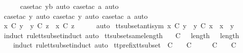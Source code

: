 \begin{isabellebody}
\ \ \ \ \isamarkupfalse%
\ {\isacharparenleft}case{\isacharunderscore}tac\ yb{\isacharcomma}\ auto{\isacharcomma}\ case{\isacharunderscore}tac\ a{\isacharcomma}\ auto{\isacharparenright}\isanewline
\ \ \ \ \isamarkupfalse%
\ {\isacharparenleft}case{\isacharunderscore}tac\ y{\isacharcomma}\ auto{\isacharcomma}\ case{\isacharunderscore}tac\ y{\isacharcomma}\ auto{\isacharcomma}\ case{\isacharunderscore}tac\ a{\isacharcomma}\ auto{\isacharparenright}{\isacharplus}\isanewline
\ \ \ \ \isamarkupfalse%
\ \ \isanewline
\ \ \isamarkupfalse%
\ \isamarkupfalse%
\ {\isachardoublequoteopen}x\ {\isasymsubseteq}\isactrlsub C\ y\ {\isasymLongrightarrow}\ y\ {\isasymsubseteq}\isactrlsub C\ z\ {\isasymLongrightarrow}\ x\ {\isasymsubseteq}\isactrlsub C\ z{\isachardoublequoteclose}\isanewline
\ \ \ \ \isamarkupfalse%
\ auto\isanewline
{}\isamarkupfalse%
%
\endisatagproof
{\isafoldproof}%
%
\isadelimproof
\isanewline
%
\endisadelimproof
\isanewline
{}\isamarkupfalse%
\ tt{\isacharunderscore}subset{\isacharunderscore}antisym{\isacharcolon}\ {\isachardoublequoteopen}x\ {\isasymsubseteq}\isactrlsub C\ y\ {\isasymLongrightarrow}\ y\ {\isasymsubseteq}\isactrlsub C\ x\ {\isasymLongrightarrow}\ x\ {\isacharequal}\ y{\isachardoublequoteclose}\isanewline
%
\isadelimproof
\ \ %
\endisadelimproof
%
\isatagproof
{}\isamarkupfalse%
\ {\isacharparenleft}induct\ rule{\isacharcolon}tt{\isacharunderscore}subset{\isachardot}induct{\isacharcomma}\ auto{\isacharparenright}%
\endisatagproof
{\isafoldproof}%
%
\isadelimproof
\isanewline
%
\endisadelimproof
\isanewline
{}\isamarkupfalse%
\ tt{\isacharunderscore}subset{\isacharunderscore}same{\isacharunderscore}length{\isacharcolon}\isanewline
\ \ {\isachardoublequoteopen}{\isasymrho}\ {\isasymsubseteq}\isactrlsub C\ {\isasymsigma}\ {\isasymLongrightarrow}\ length\ {\isasymrho}\ {\isacharequal}\ length\ {\isasymsigma}{\isachardoublequoteclose}\isanewline
%
\isadelimproof
\ \ %
\endisadelimproof
%
\isatagproof
{}\isamarkupfalse%
\ {\isacharparenleft}induct\ rule{\isacharcolon}tt{\isacharunderscore}subset{\isachardot}induct{\isacharcomma}\ auto{\isacharparenright}%
\endisatagproof
{\isafoldproof}%
%
\isadelimproof
\isanewline
%
\endisadelimproof
\isanewline
{}\isamarkupfalse%
\ tt{\isacharunderscore}prefix{\isacharunderscore}tt{\isacharunderscore}subset{\isacharcolon}\ {\isachardoublequoteopen}{\isasymsigma}{\isacharprime}\ {\isasymle}\isactrlsub C\ {\isasymsigma}\ {\isasymLongrightarrow}\ {\isasymrho}\ {\isasymsubseteq}\isactrlsub C\ {\isasymsigma}\ {\isasymLongrightarrow}\ {\isasymexists}\ {\isasymrho}{\isacharprime}{\isachardot}\ {\isasymrho}{\isacharprime}\ {\isasymsubseteq}\isactrlsub C\ {\isasymsigma}{\isacharprime}\ {\isasymand}\ {\isasymrho}{\isacharprime}\ {\isasymle}\isactrlsub C\ {\isasymrho}{\isachardoublequoteclose}\isanewline

\end{isabellebody}
